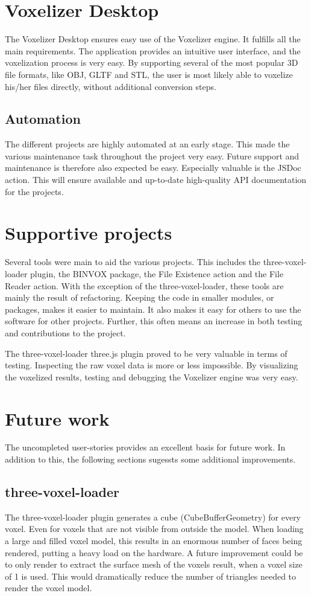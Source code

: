 \section{Voxelizer Desktop}
The Voxelizer Desktop ensures easy use of the Voxelizer engine. It fulfills all the main requirements. The application provides an intuitive user interface, and the voxelization process is very easy. By supporting several of the most popular 3D file formats, like OBJ, GLTF and STL, the user is most likely able to voxelize his/her files directly, without additional conversion steps.

\subsection{Automation}
The different projects are highly automated at an early stage. This made the various maintenance task throughout the project very easy. Future support and maintenance is therefore also expected be easy. Especially valuable is the JSDoc action. This will ensure available and up-to-date high-quality API documentation for the projects.

\section{Supportive projects}
Several tools were main to aid the various projects. This includes the three-voxel-loader plugin, the BINVOX package, the File Existence action and the File Reader action. With the exception of the three-voxel-loader, these tools are mainly the result of refactoring. Keeping the code in smaller modules, or packages, makes it easier to maintain. It also makes it easy for others to use the software for other projects. Further, this often means an increase in both testing and contributions to the project.

The three-voxel-loader three.js plugin proved to be very valuable in terms of testing. Inspecting the raw voxel data is more or less impossible. By visualizing the voxelized results, testing and debugging the Voxelizer engine was very easy.

\section{Future work}
The uncompleted user-stories provides an excellent basis for future work. In addition to this, the following sections sugessts some additional improvements.
\subsection{three-voxel-loader}
The three-voxel-loader plugin generates a cube (CubeBufferGeometry) for every voxel. Even for voxels that are not visible from outside the model. When loading a large and filled voxel model, this results in an enormous number of faces being rendered, putting a heavy load on the hardware. A future improvement could be to only render to extract the surface mesh of the voxels result, when a voxel size of 1 is used. This would dramatically reduce the number of triangles needed to render the voxel model.


